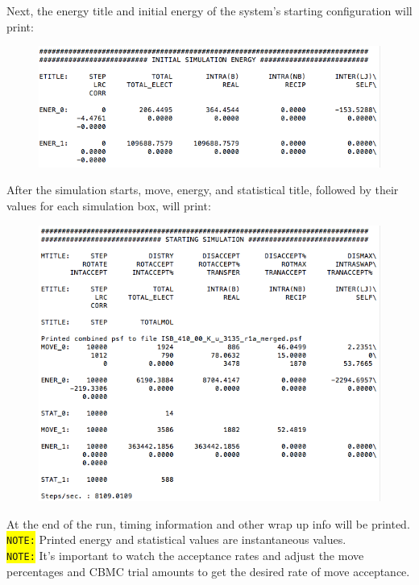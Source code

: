 \newpage
Next, the energy title and initial energy of the system's starting configuration will print:\\
\begin{figure}[H]
\includegraphics[scale=1]{images/out3}
\end{figure}
After the simulation starts, move, energy, and statistical title, followed by their values for each simulation box, will print:
\begin{figure}[H]
\includegraphics[scale=1]{images/out4}
\end{figure}
At the end of the run, timing information and other wrap up info will be printed.\\
\colorbox{yellow}{\texttt{NOTE:}} Printed energy and statistical values are instantaneous values.\\
\colorbox{yellow}{\texttt{NOTE:}} It's important to watch the acceptance rates and adjust the move percentages and CBMC trial amounts to get the desired rate of move acceptance.
